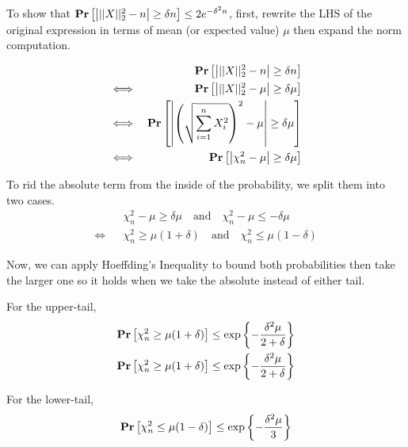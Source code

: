 To show that $\mathbf{Pr}\left[\left|||X||_2^2 - n\right| \geq \delta n\right] \leq 2e^{-\delta^2n}$, first, rewrite the LHS of the original expression in terms of mean (or expected value) $\mu$ then expand the norm computation.

\begin{equation*}
\begin{aligned}
	&&\mathbf{Pr}\left[\left|||X||_2^2 - n\right| \geq \delta n\right] \\
	\iff && \mathbf{Pr}\left[\left|||X||_2^2 - \mu\right| \geq \delta\mu\right] \\
	\iff && \mathbf{Pr}\left[\left|\left(\sqrt{\sum_{i=1}^n X_i^2}\right)^2 - \mu\right| \geq \delta\mu\right] \\
	\iff && \mathbf{Pr}\left[\left|\chi^2_n - \mu\right| \geq \delta\mu\right]
\end{aligned}
\end{equation*}

To rid the absolute term from the inside of the probability, we split them into two cases.
\begin{equation*}
\begin{aligned}
	&& \chi^2_n - \mu \geq \delta\mu \quad\text{and}\quad \chi^2_n - \mu \leq -\delta\mu \\
	\iff && \chi^2_n \geq \mu(1 + \delta) \quad\text{and}\quad \chi^2_n \leq \mu(1 - \delta)
\end{aligned}
\end{equation*}

Now, we can apply Hoeffding's Inequality to bound both probabilities then take the larger one so it holds when we take the absolute instead of either tail.

For the upper-tail,
\begin{equation*}
\begin{aligned}
	\mathbf{Pr}\left[\chi^2_n \geq \mu(1 + \delta)\right] &\leq \exp\left\{-\frac{\delta^2\mu}{2 + \delta}\right\} \\
	\mathbf{Pr}\left[\chi^2_n \geq \mu(1 + \delta)\right] &\leq \exp\left\{-\frac{\delta^2\mu}{2 + \delta}\right\} \\
\end{aligned}
\end{equation*}

For the lower-tail,
\begin{equation*}
\begin{aligned}
	\mathbf{Pr}\left[\chi^2_n \leq \mu(1 - \delta)\right] &\leq \exp\left\{-\frac{\delta^2\mu}{3}\right\} \\
\end{aligned}
\end{equation*}
